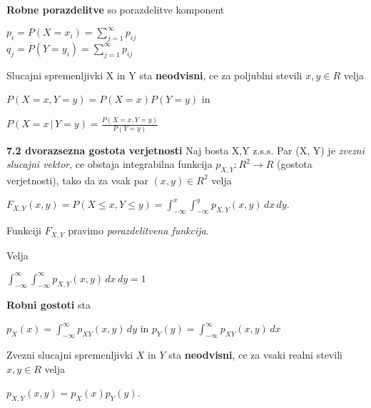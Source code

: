 \documentclass{article}
\begin{document}
\begin{multicols}{3}
\textbf{Robne porazdelitve} so porazdelitve komponent\\
\begin{center}
    \begin{math}
        p_i = P(X = x_i) = \sum_{j = 1}^{\infty} p_{ij}
    \end{math}\\
    \begin{math}
        q_j = P(Y = y_i) = \sum_{j = 1}^{\infty} p_{ij}
    \end{math}
\end{center}
Slucajni spremenljivki X in Y sta \textbf{neodvisni},
ce za poljublni stevili $x,y \in R$ velja
\begin{center}
    \begin{math}
        P(X = x, Y = y) = P(X = x)P(Y = y)
    \end{math} in
\end{center}
\begin{center}
    \begin{math}
        P(X = x\, |\, Y = y) = \frac{P(X = x, Y = y)}{P(Y = y)}
    \end{math}
\end{center}

\textbf{7.2 dvorazsezna gostota verjetnosti}
Naj bosta X,Y z.s.s. Par (X, Y) je \textit{zvezni slucajni vektor},
ce obstaja integrabilna funkcija $p_{X,Y}: R^2 \rightarrow R$ (gostota verjetnosti), tako da za
vsak par $(x,y) \in R^2$ velja
\begin{center}
    \begin{math}
        F_{X,Y}(x, y) = P(X \leq x, Y \leq y) = \int_{-\infty}^{x}\int_{-\infty}^{y} p_{X,Y}(x,y)\,dx\,dy
    \end{math}.
\end{center}
\begin{small}
Funkciji $F_{X,Y}$ pravimo \textit{porazdelitvena funkcija}.    
\end{small}
Velja
\begin{center}
    \begin{math}
        \int_{-\infty}^{\infty}\int_{-\infty}^{\infty} p_{X,Y}(x,y)\,dx\,dy = 1
    \end{math}
\end{center}
\textbf{Robni gostoti} sta
\begin{center}
    \begin{math}
        p_X(x) = \int_{-\infty}^{\infty} p_{XY}(x,y)\, dy
    \end{math} in
    \begin{math}
        p_Y(y) = \int_{-\infty}^{\infty} p_{XY}(x,y)\, dx
    \end{math}
\end{center}
Zvezni slucajni spremenljivki $X$ in $Y$ sta \textbf{neodvisni}, ce
za vsaki realni stevili $x, y \in R$ velja
\begin{center}
    \begin{math}
        p_{X,Y}(x,y) = p_X(x)p_Y(y)
    \end{math}.
\end{center}


\end{multicols}
\end{document}

